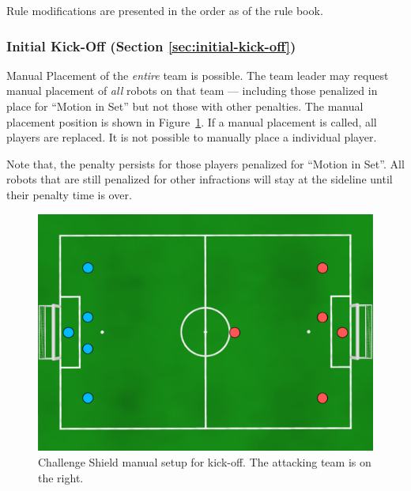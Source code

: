 Rule modifications are presented in the order as of the rule book.

\subsubsection{Initial Kick-Off (Section \ref{sec:initial-kick-off})}
Manual Placement of the \emph{entire} team is possible. The team leader may request manual placement of \emph{all} robots on that team --- including those penalized in place for ``Motion in Set'' but not those with other penalties. The manual placement position is shown in Figure~\ref{fig:ko-manual}. If a manual placement is called, all players are replaced. It is not possible to manually place a individual player.

Note that, the penalty persists for those players penalized for ``Motion in Set''. All robots that are still penalized for other infractions will stay at the sideline until their penalty time is over.

\begin{figure}[t]
\centerline{\includegraphics[width=\columnwidth]{figs/manual-placement-cs.pdf}}
\caption{Challenge Shield manual setup for kick-off.  The attacking team is on the right.}
\label{fig:ko-manual}
\end{figure}

%

